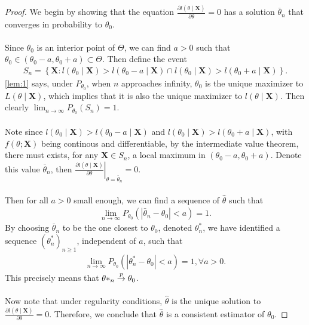 \begin{proof}
We begin by showing that the equation $\frac{\partial l(\theta\mid \bm{X})}{\partial\theta}=0$ has a solution $\bar{\theta}_n$ that converges in probability to $\theta_0$.\\\\
Since $\theta_0$ is an interior point of $\Theta$, we can find $a>0$ such that $\theta_0 \in (\theta_0-a, \theta_0+a) \subset \Theta$. Then define the event
\begin{align*}
S_n = \left\{ \bm{X}: l(\theta_0 \mid \bm{X}) > l(\theta_0 - a \mid \bm{X}) \cap l(\theta_0 \mid \bm{X}) > l(\theta_0 + a \mid \bm{X}) \right\}.
\end{align*}
\cref{lem:1} says, under $P_{\theta_0}$, when $n$ approaches infinity, $\theta_0$ is the unique maximizer to $L(\theta\mid \bm{X})$, which implies that it is also the unique maximizer to $l(\theta\mid \bm{X})$. Then clearly $\lim_{n\to\infty}P_{\theta_0}(S_n) = 1$.\\\\
Note since $l(\theta_0\mid \bm{X}) > l(\theta_0-a\mid \bm{X})$ and $l(\theta_0\mid \bm{X}) > l(\theta_0+a\mid \bm{X})$, with $f(\theta; \bm{X})$ being continous and differentiable, by the intermediate value theorem, there must exists, for any $\bm{X}\in S_n$, a local maximum in $(\theta_0-a, \theta_0+a)$. Denote this value $\bar{\theta}_n$, then $\left.\frac{\partial l(\theta\mid \bm{X})}{\partial\theta}\right\vert_{\theta=\bar{\theta}_n}=0$.\\\\
Then for all $a>0$ small enough, we can find a sequence of $\hat{\theta}$ such that
\begin{align*}
\lim_{n\to\infty}P_{\theta_0}\left( |\bar{\theta}_n - \theta_0| < a \right) = 1.
\end{align*}
By choosing $\bar{\theta}_n$ to be the one closest to $\theta_0$, denoted $\theta^*_n$, we have identified a sequence $\left(\theta^*_n\right)_{n\geq1}$, independent of $a$, such that
\begin{align*}
\lim_{n\to\infty}P_{\theta_0}\left( |\theta^*_n - \theta_0| < a \right) = 1, \forall a > 0.
\end{align*}
This precisely means that $\theta*_n \overset{p}{\rightarrow} \theta_0$.\\\\
Now note that under regularity conditions, $\hat{\theta}$ is the unique solution to $\frac{\partial l(\theta\mid \bm{X})}{\partial\theta}=0$. Therefore, we conclude that $\hat{\theta}$ is a consistent estimator of $\theta_0$.
\end{proof}
